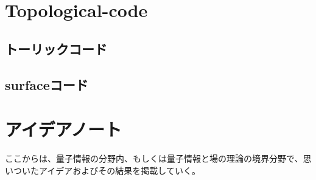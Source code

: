 \documentclass[a4paper,10.5pt]{article}
\numberwithin{equation}{section}
\begin{document}
\section{Topological-code}
\subsection{トーリックコード}
\subsection{surfaceコード}

\section{アイデアノート}
ここからは、量子情報の分野内、もしくは量子情報と場の理論の境界分野で、思いついたアイデアおよびその結果を掲載していく。
\end{document}
